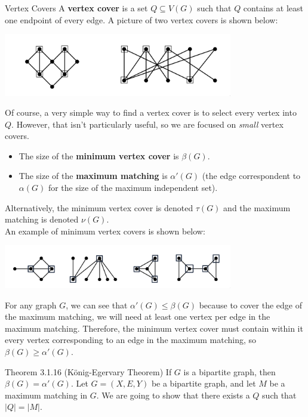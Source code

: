 \documentclass[10pt]{extarticle}
\begin{document}
  \begin{problem}{Vertex Covers}
    A \textbf{vertex cover} is a set $Q\subseteq V(G)$ such that $Q$ contains at least one endpoint of every edge. A picture of two vertex covers is shown below:
    \begin{center}
      \includegraphics[width=10cm]{vertex_covers}
    \end{center}
    Of course, a very simple way to find a vertex cover is to select every vertex into $Q$. However, that isn't particularly useful, so we are focused on \textit{small} vertex covers.\\
    \begin{itemize}
      \item The size of the \textbf{minimum vertex cover} is $\beta(G)$.
      \item The size of the \textbf{maximum matching} is $\alpha'(G)$ (the edge correspondent to $\alpha(G)$ for the size of the maximum independent set).
    \end{itemize}
    Alternatively, the minimum vertex cover is denoted $\tau(G)$ and the maximum matching is denoted $\nu(G)$.\\
    
    An example of minimum vertex covers is shown below:
    \begin{center}
      \includegraphics[width=10cm]{vertex_cover_example}
    \end{center}
    For any graph $G$, we can see that $\alpha'(G) \leq \beta(G)$ because to cover the edge of the maximum matching, we will need at least one vertex per edge in the maximum matching. Therefore, the minimum vertex cover must contain within it every vertex corresponding to an edge in the maximum matching, so $\beta(G) \geq \alpha'(G)$.\\

    \begin{problem}{Theorem 3.1.16 (König-Egervary Theorem)}
      If $G$ is a bipartite graph, then $\beta(G) = \alpha'(G)$.
      \tcblower
      Let $G=(X,E,Y)$ be a bipartite graph, and let $M$ be a maximum matching in $G$. We are going to show that there exists a $Q$ such that $|Q|=|M|$.\\


\end{problem}
\end{problem}
\end{document}

